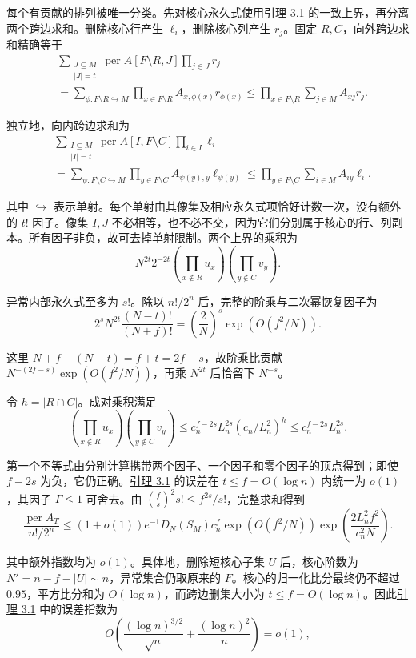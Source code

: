\documentclass[11pt,a4paper]{article}
\newcommand{\paperref}[2]{\hyperref[#1]{#2}}
\begin{document}
每个有贡献的排列被唯一分类。先对核心永久式使用\paperref{thm-3.1}{引理 3.1} 的一致上界，再分离两个跨边求和。删除核心行产生 \(\ell_i\)，删除核心列产生 \(r_j\)。固定 \(R,C\)，向外跨边求和精确等于
\[\begin{aligned}
&\sum_{\substack{J\subseteq M\\|J|=t}}
\operatorname{per}A[F\setminus R,J]\prod_{j\in J}r_j\\
&=\sum_{\phi:F\setminus R\hookrightarrow M}
\prod_{x\in F\setminus R}A_{x,\phi(x)}r_{\phi(x)}
\le\prod_{x\in F\setminus R}\sum_{j\in M}A_{xj}r_j.
\end{aligned}\]

独立地，向内跨边求和为
\[\begin{aligned}
&\sum_{\substack{I\subseteq M\\|I|=t}}
\operatorname{per}A[I,F\setminus C]\prod_{i\in I}\ell_i\\
&=\sum_{\psi:F\setminus C\hookrightarrow M}
\prod_{y\in F\setminus C}A_{\psi(y),y}\ell_{\psi(y)}
\le\prod_{y\in F\setminus C}\sum_{i\in M}A_{iy}\ell_i.
\end{aligned}\]

其中 \(\hookrightarrow\) 表示单射。每个单射由其像集及相应永久式项恰好计数一次，没有额外的 \(t!\) 因子。像集 \(I,J\) 不必相等，也不必不交，因为它们分别属于核心的行、列副本。所有因子非负，故可去掉单射限制。两个上界的乘积为
\[N^{2t}2^{-2t}
\left(\prod_{x\notin R}u_x\right)
\left(\prod_{y\notin C}v_y\right).\]

异常内部永久式至多为 \(s!\)。除以 \(n!/2^n\) 后，完整的阶乘与二次幂恢复因子为
\[2^sN^{2t}\frac{(N-t)!}{(N+f)!}
=\left(\frac2N\right)^s\exp(O(f^2/N)).\]

这里 \(N+f-(N-t)=f+t=2f-s\)，故阶乘比贡献 \(N^{-(2f-s)}\exp(O(f^2/N))\)，再乘 \(N^{2t}\) 后恰留下 \(N^{-s}\)。

令 \(h=|R\cap C|\)。成对乘积满足
\[\left(\prod_{x\notin R}u_x\right)
\left(\prod_{y\notin C}v_y\right)
\le c_n^{f-2s}L_n^{2s}(c_n/L_n^2)^h
\le c_n^{f-2s}L_n^{2s}.\]

第一个不等式由分别计算携带两个因子、一个因子和零个因子的顶点得到；即使 \(f-2s\) 为负，它仍正确。\paperref{thm-3.1}{引理 3.1} 的误差在 \(t\le f=O(\log n)\) 内统一为 \(o(1)\)，其因子 \(\Gamma\le1\) 可舍去。由 \(\binom fs^2s!\le f^{2s}/s!\)，完整求和得到
\[\frac{\operatorname{per}A_T}{n!/2^n}
\le(1+o(1))e^{-1}D_N(S_M)c_n^f
\exp(O(f^2/N))
\exp\left(\frac{2L_n^2f^2}{c_n^2N}\right).\]

其中额外指数均为 \(o(1)\)。具体地，删除短核心子集 \(U\) 后，核心阶数为 \(N'=n-f-|U|\sim n\)，异常集合仍取原来的 \(F\)。核心的归一化比分最终仍不超过 \(0.95\)，平方比分和为 \(O(\log n)\)，而跨边删集大小为 \(t\le f=O(\log n)\)。因此\paperref{thm-3.1}{引理 3.1} 中的误差指数为
\[O\!\left(\frac{(\log n)^{3/2}}{\sqrt n}+\frac{(\log n)^2}{n}\right)=o(1),\]
\end{document}
